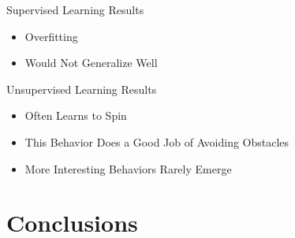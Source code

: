 \documentclass{beamer}
\begin{document}
	\begin{frame}{Supervised Learning Results}
		\begin{figure}
		\end{figure}

		\begin{itemize}
			\item Overfitting
			\item Would Not Generalize Well
		\end{itemize}
	\end{frame}

	\begin{frame}{Unsupervised Learning Results}

		\begin{itemize}
			\item Often Learns to Spin
			\item This Behavior Does a Good Job of Avoiding Obstacles
			\item More Interesting Behaviors Rarely Emerge
		\end{itemize}
	\end{frame}

\section{Conclusions}
\end{document}
